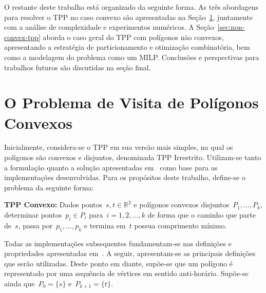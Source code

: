 \documentclass[11pt]{article}
\newenvironment{blockQuote}[1][lightgray]{\begin{mdframed}[
	leftline=true,
	topline=false,
	bottomline=false,
	rightline=false,
	linecolor=gray,
	linewidth=2pt,
	backgroundcolor=#1,
	skipabove=\baselineskip,
	skipbelow=\baselineskip,
	innerleftmargin=10pt,
	innerrightmargin=10pt,
	innertopmargin=5pt,
	innerbottommargin=5pt]
}
{\end{mdframed}}
\begin{document}
O restante deste trabalho está organizado da seguinte forma. As três abordagens para resolver o TPP no caso convexo são apresentadas na Seção~\ref{sec:convex_tpp}, juntamente com a análise de complexidade e experimentos numéricos. A Seção~\ref{sec:non-convex-tpp} aborda o caso geral do TPP com polígonos não convexos, apresentando a estratégia de particionamento e otimização combinatória, bem como a modelagem do problema como um MILP. Conclusões e perspectivas para trabalhos futuros são discutidas na seção final.

\section{O Problema de Visita de Polígonos Convexos}
\label{sec:convex_tpp}

Inicialmente, considera-se o TPP em sua versão mais simples, na qual os polígonos são convexos e disjuntos, denominada TPP Irrestrito. Utilizam-se tanto a formulação quanto a solução apresentadas em~\cite{tpp-dror2003} como base para as implementações desenvolvidas. Para os propósitos deste trabalho, define-se o problema da seguinte forma:

\begin{blockQuote}

	{\large \textbf{TPP Convexo:}} Dados pontos~\(s, t \in \mathbb{R}^2\) e polígonos convexos disjuntos~\(P_1, \dots, P_k\), determinar pontos~\(p_i \in P_i\) para~\(i = 1, 2, \dots, k\) de forma que o caminho que parte de~\(s\), passa por~\(p_1, \dots, p_k\) e termina em~\(t\) possua comprimento mínimo.

\end{blockQuote}

Todas as implementações subsequentes fundamentam-se nas definições e propriedades apresentadas em~\cite{tpp-dror2003}. A seguir, apresentam-se as principais definições que serão utilizadas. Deste ponto em diante, supõe-se que um polígono é representado por uma sequência de vértices em sentido anti-horário. Supõe-se ainda que~\(P_0 = \{s\}\) e~\(P_{k+1}=\{t\}\).
\end{document}
